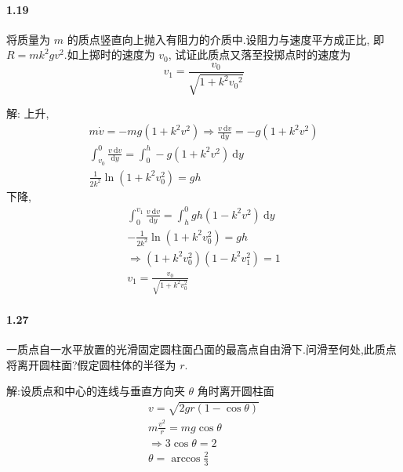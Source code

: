 \documentclass[UTF8,a4paper]{ctexart}
\begin{document}
\paragraph{1.19} 将质量为 $ m $ 的质点竖直向上抛入有阻力的介质中.设阻力与速度平方成正比, 即 $ R = m k^2 g v^2 $.如上掷时的速度为 $ v_0 $, 试证此质点又落至投掷点时的速度为\[ v_1 = \frac{ v_0 }{ \sqrt{1+k^2 {v_0}^2}} \]
\par 解:
上升,
\begin{gather*}
	m \dot{v} = -m g (1 + k^2 v^2) \Rightarrow
	\frac{v \  \mathrm{d} v}{\mathrm{d} y} = -g (1 + k^2 v^2) \\
	\int_{v_0}^{0} \frac{v \  \mathrm{d} v}{\mathrm{d} y} = \int_{0}^{h} -g \left( 1 + k^2 v^2 \right)  \  \mathrm{d} y \\
	\frac{1}{2 k^2} \ln \left( 1 + k^2 v_{0}^{2}\right) = gh
\end{gather*} 
下降,
\begin{gather*}
	\int_{0}^{v_1} \frac{v \  \mathrm{d} v}{\mathrm{d} y} = \int_{h}^{0} gh  \left( 1 - k^2 v^2 \right) \ \mathrm{d} y \\
	- \frac{1}{2k^2} \ln \left( 1 + k^2 v_{0}^2 \right) = gh \\
	\Rightarrow \left( 1 + k^{2} v_{0}^2 \right)  \left( 1 - k^2 v_{1}^{2} \right) = 1\\
	v_1 = \frac{v_0}{\sqrt{1+ k^2 v_0^2}}
\end{gather*}

\paragraph{1.27} 一质点自一水平放置的光滑固定圆柱面凸面的最高点自由滑下.问滑至何处,此质点将离开圆柱面?假定圆柱体的半径为 $ r $.
\par 解:设质点和中心的连线与垂直方向夹 $\theta$ 角时离开圆柱面
\begin{gather*}
	v = \sqrt{2 g r \left( 1 - \cos \theta \right) } \\
	m \frac{v^2}{r} = m g \cos \theta \\
	\Rightarrow 3 \cos \theta = 2 \\
	\theta = \arccos \frac{2}{3}
\end{gather*}
\end{document}
